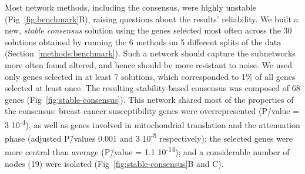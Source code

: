 \documentclass[10pt,letterpaper]{article}
\providecommand{\DIFaddtex}[1]{{\protect\color{blue}\uwave{#1}}} %
\providecommand{\DIFaddbegin}{} %
\providecommand{\DIFaddend}{} %
\providecommand{\DIFadd}[1]{\texorpdfstring{\DIFaddtex{#1}}{#1}} %
\newcommand{\DIFaddincludegraphics}[2][]{{\color{blue}\fbox{\DIFOincludegraphics[#1]{#2}}}} %
\DeclareRobustCommand{\DIFaddbegin}{\DIFOaddbegin \let\includegraphics\DIFaddincludegraphics} %
\DeclareRobustCommand{\DIFaddend}{\DIFOaddend \let\includegraphics\DIFOincludegraphics} %
\begin{document}
Most network methods, including the consensus, were highly unstable (Fig~\ref{fig:benchmark}B), raising questions about the results' reliability. We built a new, \emph{stable consensus} solution using the genes selected most often across the 30 solutions obtained by running the 6 methods on 5 different splits of the data (Section~\ref{methods:benchmark}). Such a network should capture the subnetworks more often found altered, and hence should be more resistant to noise. We used only genes selected in at least 7 solutions, which corresponded to 1\% of all genes selected at least once. The resulting stability-based consensus was composed of 68 genes (Fig~\ref{fig:stable-consensus}\DIFaddbegin \DIFadd{A}\DIFaddend ). This network shared most of the properties of the consensus: breast cancer susceptibility genes were overrepresented (P\=/value = 3 \texttimes{} 10\textsuperscript{-4}), as well as genes involved in mitochondrial translation and the attenuation phase (adjusted P\=/values 0.001 and 3 \texttimes{} 10\textsuperscript{-5} respectively); the selected genes were more central than average (P\=/value = 1.1 \texttimes{} 10\textsuperscript{-14}); and a considerable number of nodes (19) were isolated (Fig~\ref{fig:stable-consensus}B and C).
\end{document}
